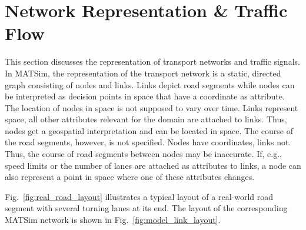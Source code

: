 %


\section{Network Representation \& Traffic Flow}
\label{sec:signals_network_traffic_flow}

This section discusses the representation of transport networks and traffic signals. In MATSim, the representation of  the transport network is a static, directed graph consisting of nodes and links. 
Links depict road segments while nodes can be interpreted as decision points in space that have a coordinate as attribute. 
The location of nodes in space is not supposed to vary over time. 
Links represent space, all other attributes relevant for the domain are attached to links. 
Thus, nodes get a geospatial interpretation and can be located in space. 
The course of the road segments, however, is not specified. 
Nodes have coordinates, links not. 
Thus, the course of road segments between nodes may be inaccurate. 
If, e.g., speed limits or the number of lanes are attached as attributes to links, a node can also represent a point in space where one of these attributes changes.  

Fig.~\ref{fig:real_road_layout} illustrates a typical layout of a real-world road segment with several turning lanes at its end. 
The layout of the corresponding MATSim network is shown in Fig.~\ref{fig:model_link_layout}. 

